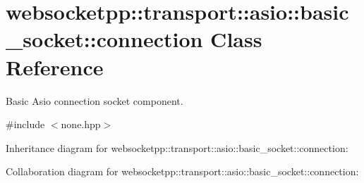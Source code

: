 \hypertarget{classwebsocketpp_1_1transport_1_1asio_1_1basic__socket_1_1connection}{}\section{websocketpp\+:\+:transport\+:\+:asio\+:\+:basic\+\_\+socket\+:\+:connection Class Reference}
\label{classwebsocketpp_1_1transport_1_1asio_1_1basic__socket_1_1connection}


Basic Asio connection socket component.  




{\ttfamily \#include $<$none.\+hpp$>$}



Inheritance diagram for websocketpp\+:\+:transport\+:\+:asio\+:\+:basic\+\_\+socket\+:\+:connection\+:


Collaboration diagram for websocketpp\+:\+:transport\+:\+:asio\+:\+:basic\+\_\+socket\+:\+:connection\+:

